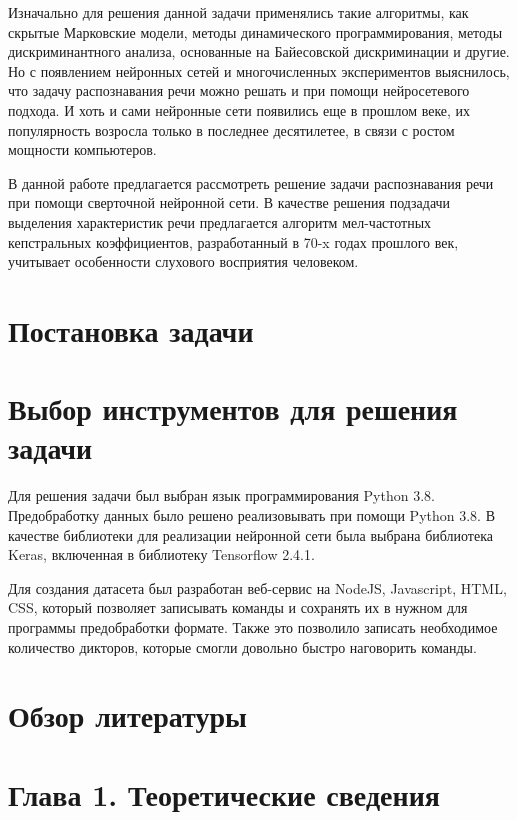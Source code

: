 \documentclass[14pt]{article}
\begin{document}
Изначально для решения данной задачи применялись такие алгоритмы, как скрытые Марковские модели, методы динамического программирования, методы дискриминантного анализа, основанные на Байесовской дискриминации и другие. Но с появлением нейронных сетей и многочисленных экспериментов выяснилось, что задачу распознавания речи можно решать и при помощи нейросетевого подхода. И хоть и сами нейронные сети появились еще в прошлом веке, их популярность возросла только в последнее десятилетее, в связи с ростом мощности компьютеров.

В данной работе предлагается рассмотреть решение задачи распознавания речи при помощи сверточной нейронной сети. В качестве решения подзадачи выделения характеристик речи предлагается алгоритм мел-частотных кепстральных коэффициентов, разработанный в 70-x годах прошлого век, учитывает особенности слухового восприятия человеком.

\section*{Постановка задачи}


\section*{Выбор инструментов для решения задачи}
Для решения задачи был выбран язык программирования Python 3.8. Предобработку данных было решено реализовывать при помощи Python 3.8.
В качестве библиотеки для реализации нейронной сети была выбрана библиотека Keras, включенная в библиотеку Tensorflow 2.4.1.

Для создания датасета был разработан веб-сервис на NodeJS, Javascript, HTML, CSS, который позволяет записывать команды и сохранять их в нужном для программы предобработки формате. Также это позволило записать необходимое количество дикторов, которые смогли довольно быстро наговорить команды.
\newpage

\section*{Обзор литературы}
\newpage

\section*{Глава 1. Теоретические сведения}
\newpage
\end{document}
